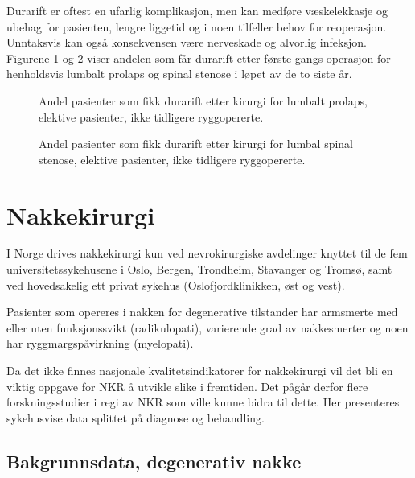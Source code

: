 \documentclass [norsk,a4paper,twoside]{article}\usepackage[]{graphicx}\usepackage[]{color}
\begin{document}
Durarift er oftest en ufarlig komplikasjon, men kan medføre væskelekkasje og
ubehag for pasienten, lengre liggetid og i noen tilfeller behov for reoperasjon.
Unntaksvis kan også konsekvensen være nerveskade og alvorlig infeksjon. Figurene \ref{fig:DuraPro} og \ref{fig:DuraSS} 
viser andelen som får durarift etter første gangs operasjon for henholdsvis lumbalt prolaps og spinal stenose i løpet av de to siste år.

\begin{figure}[ht]
      \caption{\label{fig:DuraPro} Andel pasienter som fikk durarift etter kirurgi for lumbalt prolaps, 
      elektive pasienter, ikke tidligere ryggopererte.}
      \end{figure}
      
\begin{figure}[ht]
\caption{\label{fig:DuraSS} Andel pasienter som fikk durarift etter kirurgi for lumbal 
                  spinal stenose, elektive pasienter, ikke tidligere ryggopererte.}
\end{figure}

\clearpage



\section{Nakkekirurgi}

I Norge drives nakkekirurgi kun ved nevrokirurgiske avdelinger knyttet til de fem
universitetssykehusene i Oslo, Bergen, Trondheim, Stavanger og Tromsø, samt ved
hovedsakelig ett privat sykehus (Oslofjordklinikken, øst og vest).

Pasienter som opereres i nakken for degenerative tilstander har armsmerte med eller 
uten funksjonssvikt (radikulopati), varierende grad av nakkesmerter og noen har ryggmargspåvirkning (myelopati). 

Da  det ikke finnes nasjonale kvalitetsindikatorer for nakkekirurgi vil det bli en
viktig oppgave for NKR å utvikle slike i fremtiden. Det pågår derfor flere forskningsstudier i regi av NKR som ville kunne bidra til dette. 
Her presenteres sykehusvise data splittet på diagnose og behandling.




\subsection{Bakgrunnsdata, degenerativ nakke}
\end{document}
